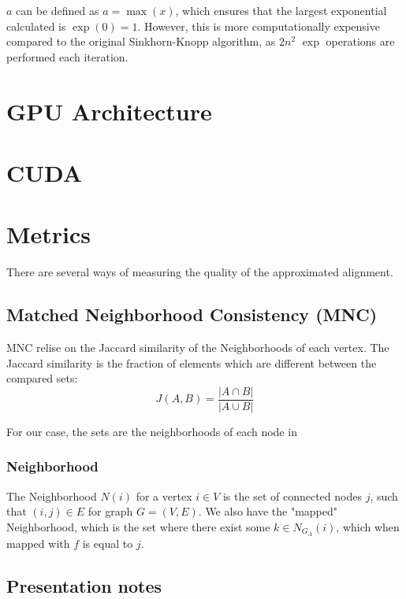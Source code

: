\documentclass{article}
\begin{document}
$a$ can be defined as $a = \max(x)$, which ensures that the largest exponential calculated is $\exp(0) = 1$. However, this is more computationally expensive compared to the original Sinkhorn-Knopp algorithm, as $2n^2$ $\exp$ operations are performed each iteration.

\section{GPU Architecture}
\section{CUDA}

\section{Metrics}
There are several ways of measuring the quality of the approximated alignment.
\subsection{Matched Neighborhood Consistency (MNC)}
MNC relise on the Jaccard similarity of the Neighborhoods of each vertex. The Jaccard similarity is the fraction of elements which are different between the compared sets:
$$
J(A, B) = \frac{|A \cap B|}{|A \cup B|}
$$

For our case, the sets are the neighborhoods of each node in 

\subsubsection{Neighborhood}
The Neighborhood $N(i)$ for a vertex $i \in V$ is the set of connected nodes $j$, such that $(i, j) \in E$ for graph $G = (V, E)$. We also have the "mapped" Neighborhood, which is the set where there exist some $k \in N_{G_A}(i)$, which when mapped with $f$ is equal to $j$. 

\subsection{Presentation notes}
\end{document}
